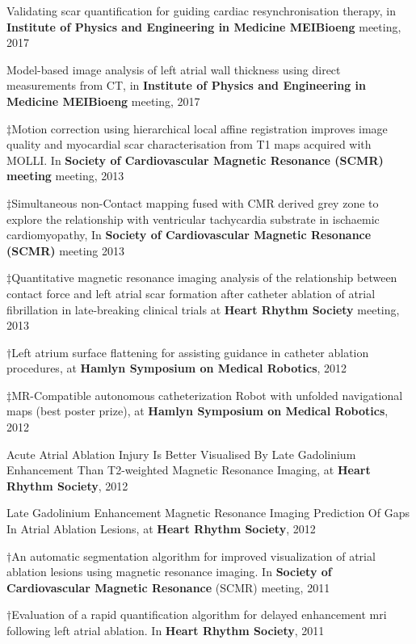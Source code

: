 \renewcommand{\theenumi}{A\arabic{enumi}}
\begin{etaremune}
\item *Validating scar quantification for guiding cardiac resynchronisation therapy, in \textbf{Institute of Physics and Engineering in Medicine MEIBioeng} meeting, 2017
\item *Model-based image analysis of left atrial wall thickness using direct measurements from CT, in \textbf{Institute of Physics and Engineering in Medicine MEIBioeng} meeting, 2017  
\item $\ddagger$Motion correction using hierarchical local affine registration improves image quality and myocardial scar characterisation from T1 maps acquired with MOLLI. In \textbf{Society of Cardiovascular Magnetic Resonance (SCMR) meeting} meeting, 2013
\item $\ddagger$Simultaneous non-Contact mapping fused with CMR derived grey zone to explore the relationship with ventricular tachycardia substrate in ischaemic cardiomyopathy, In \textbf{Society of Cardiovascular Magnetic Resonance (SCMR)} meeting 2013 
\item $\ddagger$Quantitative magnetic resonance imaging analysis of the relationship between contact force and left atrial scar formation after catheter ablation of atrial fibrillation in late-breaking clinical trials at \textbf{Heart Rhythm Society} meeting, 2013 
\item $\dagger$Left atrium surface flattening for assisting guidance in catheter ablation procedures, at \textbf{Hamlyn Symposium on Medical Robotics}, 2012
\item $\ddagger$MR-Compatible autonomous catheterization Robot with unfolded navigational maps (best poster prize), at \textbf{Hamlyn Symposium on Medical Robotics}, 2012
\item Acute Atrial Ablation Injury Is Better Visualised By Late Gadolinium Enhancement Than T2-weighted Magnetic Resonance Imaging, at \textbf{Heart Rhythm Society}, 2012
\item Late Gadolinium Enhancement Magnetic Resonance Imaging Prediction Of Gaps In Atrial Ablation Lesions, at \textbf{Heart Rhythm Society}, 2012  
\item $\dagger$An automatic segmentation algorithm for improved visualization of atrial ablation lesions using magnetic resonance imaging. In  \textbf{Society of Cardiovascular Magnetic Resonance} (SCMR) meeting, 2011
\item $\dagger$Evaluation of a rapid quantification algorithm for delayed enhancement mri following left atrial ablation. In \textbf{Heart Rhythm Society}, 2011

\end{etaremune}
